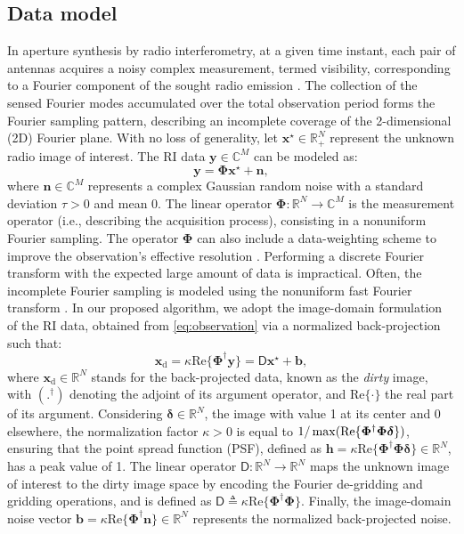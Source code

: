 \documentclass[preprint2,twocolumn]{aastex631}
\newcommand{\xb}{\ensuremath{\boldsymbol{x}}}
\newcommand{\yb}{\ensuremath{\boldsymbol{y}}}
\newcommand{\nb}{\ensuremath{\boldsymbol{n}}}
\newcommand{\hb}{\ensuremath{\boldsymbol{{h}}}}
\newcommand{\bb}{\ensuremath{\boldsymbol{{b}}}}
\newcommand{\Db}{\ensuremath{\boldsymbol{\mathsf{D}}}}
\newcommand{\Phib}{\ensuremath{\boldsymbol{\Phi}}}
\newcommand{\eC}{\mathbb{C}}
\newcommand{\eR}{\mathbb{R}}
\begin{document}
\subsection{Data model} \label{subsec:data-model}
In aperture synthesis by radio interferometry, at a given time instant, each pair of antennas acquires a noisy complex measurement, termed visibility, corresponding to a Fourier component of the sought radio emission \citep{thompson2017interferometry}. The collection of the sensed Fourier modes accumulated over the total observation period forms the Fourier sampling pattern, describing an incomplete coverage of the {2-dimensional} (2D) Fourier plane. With no loss of generality, let ${\xb^{\star}}\in\mathbb{R}_{+}^N$ represent the unknown radio image of interest. The RI data ${\yb}\in\eC^M$ can be modeled as:
\begin{equation}
{\yb}={\Phib} {\xb^{\star}}+\nb,
\label{eq:observation}
\end{equation}
where $\nb \in \eC^{M}$ represents a complex Gaussian random noise with a standard deviation $\tau>0$ and mean 0. The linear operator ${\Phib}\colon \eR^N \to \eC^M$ is the measurement operator (i.e., describing the acquisition process), consisting in a nonuniform Fourier sampling. The operator ${\Phib}$ can also include a data-weighting scheme to improve the observation's effective resolution \citep[e.g., Briggs weighting; ][]{briggs1995}. Performing a discrete Fourier transform with the expected large amount of data is impractical. Often, the incomplete Fourier sampling is modeled using the nonuniform fast Fourier transform \citep[NUFFT;][]{Fessler2003,thompson2017interferometry}. In our proposed algorithm, we adopt the image-domain formulation of the RI data, obtained from \eqref{eq:observation} via a normalized back-projection such that:
\begin{equation}
\xb_{\textrm{d}} =\kappa \text{Re}\{\Phib^\dagger \yb\}=\Db{{\xb^{\star}}}+ {\bb},
\label{eq:backprojection}
\end{equation}
where $\xb_{\textrm{d}} \in \eR^N$ stands for the back-projected data, known as the \textit{dirty} image, with $(.^\dagger)$ denoting the adjoint of its argument operator, and $\text{Re}\{\cdot\}$ the real part of its argument. Considering $\bm{\delta} \in \eR^N$, the image with value 1 at its center and 0 elsewhere, the normalization factor $\kappa>0$ is equal to $1/\max(\textnormal{Re}\{{\Phib}^{\dagger}{\Phib}\bm{\mathsf{\delta}}\})$, ensuring that the point spread function (PSF), defined as $\hb=\kappa \text{Re}\{{\Phib}^{\dagger}{\Phib}\bm{{\delta}}\} \in \eR^{N}$, has a peak value of 1. The linear operator $\Db \colon \eR^N \to \eR^N $ maps the unknown image of interest to the dirty image space by encoding the Fourier de-gridding and gridding operations, and is defined as $\Db \triangleq \kappa \text{Re}\{{\Phib}^{\dagger}{{\Phib}}\}$. Finally, the image-domain noise vector ${\bb} =\kappa \text{Re}\{{\Phib^\dagger \nb}\} \in \eR^{N}$ represents the normalized back-projected noise.
\end{document}
